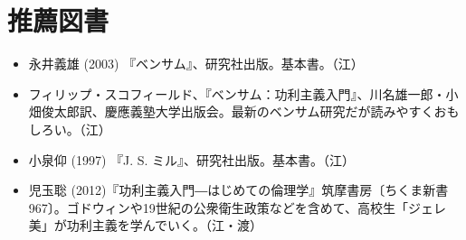 \vspace{2zw}

\section{推薦図書}


\begin{itemize}
\item 永井義雄 (2003) 『ベンサム』、研究社出版。基本書。（江）
\item フィリップ・スコフィールド、『ベンサム：功利主義入門』、川名雄一郎・小畑俊太郎訳、慶應義塾大学出版会。最新のベンサム研究だが読みやすくおもしろい。（江）
\item 小泉仰 (1997) 『J. S. ミル』、研究社出版。基本書。（江）
\item 児玉聡 (2012)『功利主義入門―はじめての倫理学』筑摩書房〔ちくま新書967〕。ゴドウィンや19世紀の公衆衛生政策などを含めて、高校生「ジェレ美」が功利主義を学んでいく。（江・渡）
\end{itemize}



